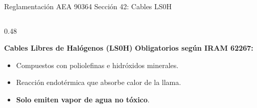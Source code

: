 \begin{frame}{Reglamentación AEA 90364 Sección 42: Cables LS0H}
\begin{columns}[T]
    \begin{column}{0.48\textwidth}
      \begin{block}{\textbf{Cables Libres de Halógenos (LS0H)}}
        \small\textcolor{successgreen!80!black}{\textbf{Obligatorios según IRAM 62267:}}
        \vspace{0.05cm}
        \begin{itemize}
          \footnotesize
          \setlength{\itemsep}{3pt}
          \item Compuestos con poliolefinas e hidróxidos minerales.
          \item Reacción endotérmica que absorbe calor de la llama.
          \item \textbf{Solo emiten vapor de agua no tóxico}.
        \end{itemize}
      \end{block}
      \vspace{0.15cm}
      \centering
    \end{column}
  \end{columns}
\end{frame}

